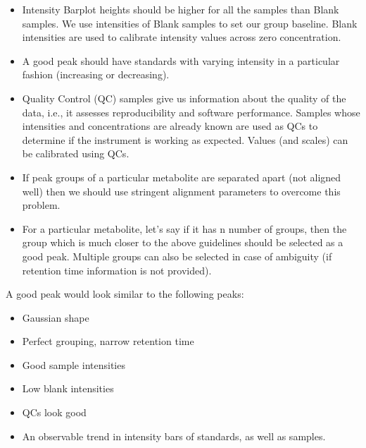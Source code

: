 \documentclass[letterpaper,10pt,english,openany,oneside]{sphinxmanual}
\begin{document}
\begin{itemize}
\item {} 
Intensity Barplot heights should be higher for all the samples than Blank samples. We use intensities of Blank samples to set our group baseline. Blank intensities are used to calibrate intensity values across zero concentration.

\item {} 
A good peak should have standards with varying intensity in a particular fashion (increasing or decreasing).

\item {} 
Quality Control (QC) samples give us information about the quality of the data, i.e., it assesses reproducibility and software performance. Samples whose intensities and concentrations are already known are used as QCs to determine if the instrument is working as expected. Values (and scales) can be calibrated using QCs.

\item {} 
If peak groups of a particular metabolite are separated apart (not aligned well) then we should use stringent alignment parameters to overcome this problem.

\item {} 
For a particular metabolite, let’s say if it has n number of groups, then the group which is much closer to the above guidelines should be selected as a good peak. Multiple groups can also be selected in case of ambiguity (if retention time information is not provided).

\end{itemize}

A good peak would look similar to the following peaks:

\begin{itemize}
\item {} 
Gaussian shape

\item {} 
Perfect grouping, narrow retention time

\item {} 
Good sample intensities

\item {} 
Low blank intensities

\item {} 
QCs look good

\item {} 
An observable trend in intensity bars of standards, as well as samples.

\end{itemize}
\end{document}
